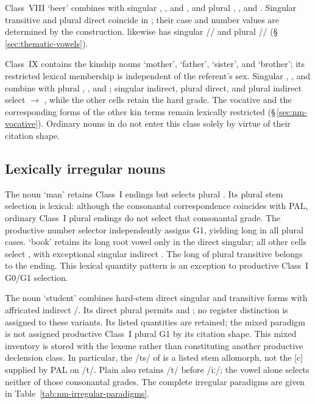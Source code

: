 Class~VIII  `beer' combines  with singular , ,
and , and plural , , and .
Singular transitive and plural direct coincide in ; their case
and number values are determined by the construction.  likewise
has singular // and plural
//
(§\,\ref{sec:thematic-vowels}).

Class~IX contains the kinship nouns  `mother',  `father',  `sister', and
 `brother'; its restricted lexical membership is
independent of the referent's sex. Singular , , and
 combine with plural , , and ;
singular indirect, plural direct, and plural indirect select 
$\rightarrow$ , while the other cells retain the hard grade.
The vocative  and the corresponding forms of the other kin terms
remain lexically restricted (§\,\ref{sec:nm-vocative}). Ordinary nouns in
 do not enter this class solely by virtue of their citation shape.


\FloatBarrier

\subsection{Lexically irregular nouns}
\label{sec:nm-irregular}

The noun  `man' retains Class~I endings but selects
plural . Its plural stem selection is lexical:
although the consonantal correspondence coincides with PAL, ordinary Class~I
plural endings do not select that consonantal grade. The productive number
selector independently assigns G1, yielding long 
in all plural cases. 
`book' retains its long root vowel only in the direct singular;
all other cells select , with
exceptional singular indirect . The long  of plural
transitive  belongs to the ending. This lexical quantity pattern
is an exception to productive Class~I G0/G1 selection.

The noun  `student' combines hard-stem direct singular and transitive
forms with affricated indirect /. Its direct
plural permits  and ; no register distinction is
assigned to these variants. Its listed quantities are retained; the mixed
paradigm is not assigned productive Class~I plural G1 by its citation shape.
This mixed inventory is stored with the lexeme
rather than constituting another productive declension class. In particular,
the /ts/ of  is a listed stem allomorph, not the [c] supplied
by PAL on /t/. Plain  also retains /t/ before /iː/;
the vowel alone selects neither of those consonantal grades. The complete
irregular paradigms are given in Table~\ref{tab:nm-irregular-paradigms}.

